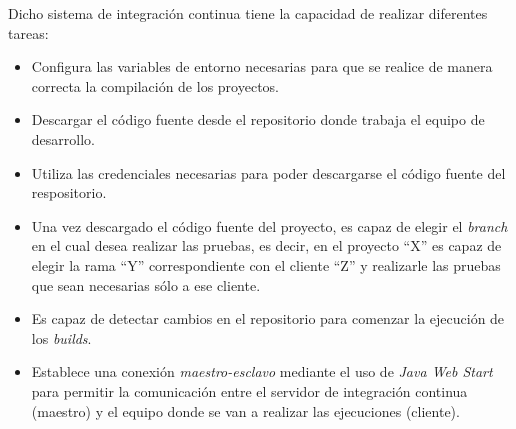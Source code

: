 Dicho sistema de integración continua tiene la capacidad de realizar diferentes tareas:
\begin{itemize}
    \item Configura las variables de entorno necesarias para que se realice de manera correcta la compilación de los proyectos.
	\item Descargar el código fuente desde el repositorio donde trabaja el equipo de desarrollo.
    \item Utiliza las credenciales necesarias para poder descargarse el código fuente del respositorio.
	\item Una vez descargado el código fuente del proyecto, es capaz de elegir el \textit{branch} en el cual desea realizar las pruebas, es decir, en el proyecto ``X'' es capaz de elegir la rama ``Y'' correspondiente con el cliente ``Z'' y realizarle las pruebas que sean necesarias sólo a ese cliente.
	\item Es capaz de detectar cambios en el repositorio para comenzar la ejecución de los \textit{builds}.
    \item Establece una conexión \textit{maestro-esclavo} mediante el uso de \textit{Java Web Start} para permitir la comunicación entre el servidor de integración continua (maestro) y el equipo donde se van a realizar las ejecuciones (cliente).
    
    \clearpage
    

\end{itemize}
